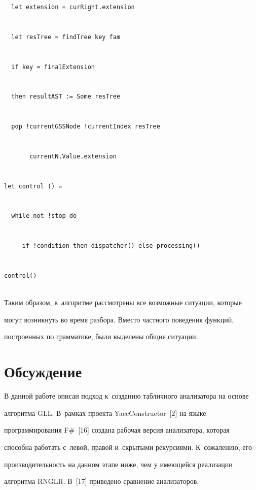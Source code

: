 \begin{verbatim}
  let extension = curRight.extension


  let resTree = findTree key fam


  if key = finalExtension


  then resultAST := Some resTree


  pop !currentGSSNode !currentIndex resTree


       currentN.Value.extension


let control () =


  while not !stop do


     if !condition then dispatcher() else processing()


control()


\end{verbatim}


	


Таким образом, в~алгоритме рассмотрены все возможные ситуации, которые


могут возникнуть во время разбора. Вместо частного поведения функций,


построенных по грамматике, были выделены общие ситуации.





\vspace*{-6pt}





\section{Обсуждение}





\vspace*{-3pt}





В данной работе описан подход к~созданию табличного анализатора на основе


алгоритма GLL. В~рамках проекта YaccConstructor~[2] на языке


программирования F\#~[16] создана рабочая версия анализатора, которая


способна работать с~левой, правой и~скрытыми рекурсиями. К~сожалению, его


производительность на данном этапе ниже, чем у имеющейся реализации


алгоритма RNGLR. В~[17] приведено сравнение анализаторов,


